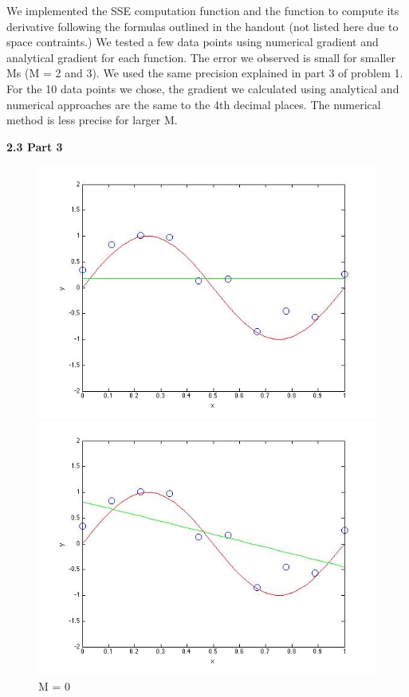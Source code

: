 We implemented the SSE computation function and the function to compute its derivative following the formulas outlined in the handout (not listed here due to space contraints.)
We tested a few data points using numerical gradient and analytical gradient for each function.
The error we observed is small for smaller Ms (M = 2 and 3).  We used the same precision explained
 in part 3 of problem 1. For the 10 data points we chose, the gradient we calculated using analytical and numerical approaches are the same to the 4th decimal places. The numerical method is less precise for larger M. 

{\bfseries 2.3 Part 3}
\begin{figure}[!htb]
  \includegraphics[width=\linewidth]{figures/p2_M=0}
  \caption{M = 0}\label{fig:figures/p2_M=0}
\endminipage\hfill
{}
  \includegraphics[width=\linewidth]{figures/p2_M=1}

\end{figure}
